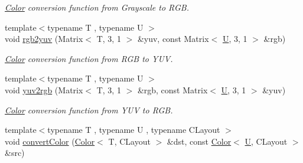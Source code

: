 \begin{DoxyCompactItemize}
\begin{DoxyCompactList}\small\item\em \hyperlink{class_d_o_1_1_color}{Color} conversion function from Grayscale to R\-G\-B. \end{DoxyCompactList}\item 
\hypertarget{group___color_conversion_gad19806a92d9d3561e4938aa8076519b3}{{\footnotesize template$<$typename T , typename U $>$ }\\void \hyperlink{group___color_conversion_gad19806a92d9d3561e4938aa8076519b3}{rgb2yuv} (Matrix$<$ T, 3, 1 $>$ \&yuv, const Matrix$<$ \hyperlink{struct_d_o_1_1_u}{U}, 3, 1 $>$ \&rgb)}\label{group___color_conversion_gad19806a92d9d3561e4938aa8076519b3}

\begin{DoxyCompactList}\small\item\em \hyperlink{class_d_o_1_1_color}{Color} conversion function from R\-G\-B to Y\-U\-V. \end{DoxyCompactList}\item 
\hypertarget{group___color_conversion_gacd81aedbb5a1d6c2cd01d98da76e0903}{{\footnotesize template$<$typename T , typename U $>$ }\\void \hyperlink{group___color_conversion_gacd81aedbb5a1d6c2cd01d98da76e0903}{yuv2rgb} (Matrix$<$ T, 3, 1 $>$ \&rgb, const Matrix$<$ \hyperlink{struct_d_o_1_1_u}{U}, 3, 1 $>$ \&yuv)}\label{group___color_conversion_gacd81aedbb5a1d6c2cd01d98da76e0903}

\begin{DoxyCompactList}\small\item\em \hyperlink{class_d_o_1_1_color}{Color} conversion function from Y\-U\-V to R\-G\-B. \end{DoxyCompactList}\item 
\hypertarget{group___color_conversion_gaf425c8b1868616a6840c61fe4a3e60c7}{{\footnotesize template$<$typename T , typename U , typename C\-Layout $>$ }\\void \hyperlink{group___color_conversion_gaf425c8b1868616a6840c61fe4a3e60c7}{convert\-Color} (\hyperlink{class_d_o_1_1_color}{Color}$<$ T, C\-Layout $>$ \&dst, const \hyperlink{class_d_o_1_1_color}{Color}$<$ \hyperlink{struct_d_o_1_1_u}{U}, C\-Layout $>$ \&src)}\label{group___color_conversion_gaf425c8b1868616a6840c61fe4a3e60c7}


\end{DoxyCompactItemize}

